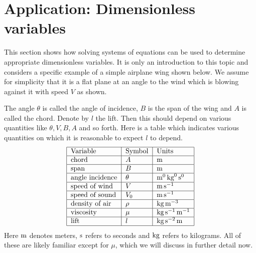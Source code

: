 \section{Application: Dimensionless variables}

This section shows how solving systems of equations can be used to
determine appropriate dimensionless variables. It is only an
introduction to this topic and considers a specific example of a
simple airplane wing shown below. We assume for simplicity that it is a flat plane at an angle to the wind which is blowing against it
with speed $V$ as shown.

\begin{center}
\end{center}

The angle $\theta$ is called the angle of incidence, $B$ is the span of the wing and $A$ is called the chord. Denote by $l$ the lift. Then this should depend on
various quantities like $\theta,V,B,A$ and so forth. Here is a table which
indicates various quantities on which it is reasonable to expect $l$ to
depend.
\begin{equation*}
\begin{tabular}{|l|l|l|}
\hline
Variable & Symbol & Units \\ \hline
chord & $A$ & $\m$ \\ \hline
span & $B$ & $\m$ \\ \hline
angle incidence & $\theta $ & $\m^0\kg^0\s^0$ \\ \hline
speed of wind & $V$ & $\m\s^{-1}$ \\ \hline
speed of sound & $V_0$ & $\m\s^{-1}$ \\ \hline
density of air & $\rho $ & $\kg\m^{-3}$ \\ \hline
viscosity & $\mu $ & $\kg\s^{-1}\m^{-1}$ \\ \hline
lift & $l$ & $\kg\s^{-2}\m$ \\ \hline
\end{tabular}
\end{equation*}
Here $\mathop{\textrm{\rm m}}\nolimits$ denotes meters, $\mathop{\textrm{\rm s}}\nolimits $ refers to seconds and $\mathop{\textrm{\rm kg}}\nolimits$ refers to
kilograms. All of these are likely familiar except for $\mu$, which we will discuss in further detail now.

